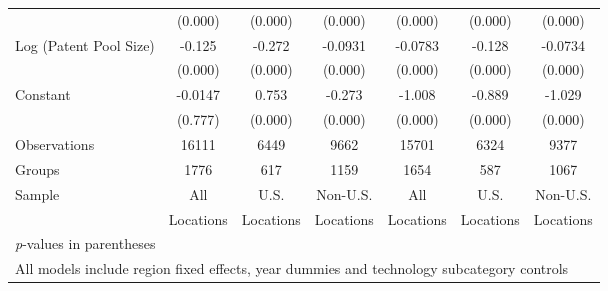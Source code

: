 {\begin{longtable}{l*{6}{c}}
                &  (0.000)&  (0.000)&  (0.000)&  (0.000)&  (0.000)&  (0.000)\\
Log (Patent Pool Size)&   -0.125&   -0.272&  -0.0931&  -0.0783&   -0.128&  -0.0734\\
                &  (0.000)&  (0.000)&  (0.000)&  (0.000)&  (0.000)&  (0.000)\\
Constant        &  -0.0147&    0.753&   -0.273&   -1.008&   -0.889&   -1.029\\
                &  (0.777)&  (0.000)&  (0.000)&  (0.000)&  (0.000)&  (0.000)\\
\hline
Observations    &    16111&     6449&     9662&    15701&     6324&     9377\\
Groups          &     1776&      617&     1159&     1654&      587&     1067\\
Sample&All &U.S. &Non-U.S.&All &U.S. &Non-U.S. \\
          &Locations &Locations&Locations&Locations &Locations&Locations \\
\hline\hline
\multicolumn{7}{l}{\footnotesize \textit{p}-values in parentheses}\\
\multicolumn{7}{l}{\footnotesize All models include region fixed effects, year dummies and technology subcategory controls}\\
\end{longtable}
}
